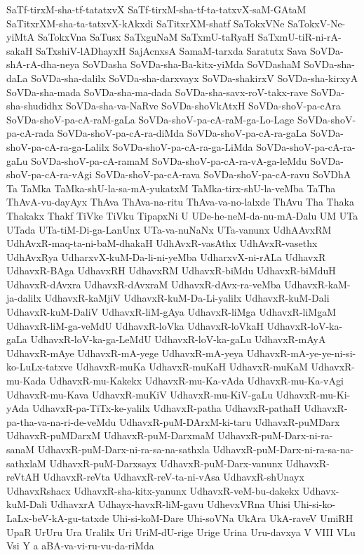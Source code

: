 {SaTf-tirxM-sha-tf-tatatxvX
SaTf-tirxM-sha-tf-ta-tatxvX-saM-GAtaM
SaTitxrXM-sha-ta-tatxvX-kAkxdi
SaTitxrXM-shatf
SaTokxVNe
SaTokxV-Ne-yiMtA
SaTokxVna
SaTusx
SaTxguNaM
SaTxmU-taRyaH
SaTxmU-tiR-ni-rA-sakaH
SaTxshiV-lADhayxH
SajAcnxsA
SamaM-tarxda
Saratutx
Sava
SoVDa-shA-rA-dha-neya
SoVDasha
SoVDa-sha-Ba-kitx-yiMda
SoVDashaM
SoVDa-sha-daLa
SoVDa-sha-dalilx
SoVDa-sha-darxvayx
SoVDa-shakirxV
SoVDa-sha-kirxyA
SoVDa-sha-mada
SoVDa-sha-ma-dada
SoVDa-sha-savx-roV-takx-rave
SoVDa-sha-shudidhx
SoVDa-sha-va-NaRve
SoVDa-shoVkAtxH
SoVDa-shoV-pa-cAra
SoVDa-shoV-pa-cA-raM-gaLa
SoVDa-shoV-pa-cA-raM-ga-Lo-Lage
SoVDa-shoV-pa-cA-rada
SoVDa-shoV-pa-cA-ra-diMda
SoVDa-shoV-pa-cA-ra-gaLa
SoVDa-shoV-pa-cA-ra-ga-Lalilx
SoVDa-shoV-pa-cA-ra-ga-LiMda
SoVDa-shoV-pa-cA-ra-gaLu
SoVDa-shoV-pa-cA-ramaM
SoVDa-shoV-pa-cA-ra-vA-ga-leMdu
SoVDa-shoV-pa-cA-ra-vAgi
SoVDa-shoV-pa-cA-rava
SoVDa-shoV-pa-cA-ravu
SoVDhA
Ta
TaMka
TaMka-shU-la-sa-mA-yukatxM
TaMka-tirx-shU-la-veMba
TaTha
ThAvA-vu-dayAyx
ThAva
ThAva-na-ritu
ThAva-va-no-lalxde
ThAvu
Tha
Thaka
Thakakx
Thakf
TiVke
TiVku
TipapxNi
U
UDe-he-neM-da-nu-mA-Dalu
UM
UTa
UTada
UTa-tiM-Di-ga-LanUnx
UTa-va-nuNaNx
UTa-vanunx
UdhAAvxRM
UdhAvxR-maq-ta-ni-baM-dhakaH
UdhAvxR-vasAthx
UdhAvxR-vasethx
UdhAvxRya
UdharxvX-kuM-Da-li-ni-yeMba
UdharxvX-ni-rALa
UdhavxR
UdhavxR-BAga
UdhavxRH
UdhavxRM
UdhavxR-biMdu
UdhavxR-biMduH
UdhavxR-dAvxra
UdhavxR-dAvxraM
UdhavxR-dAvx-ra-veMba
UdhavxR-kaM-ja-dalilx
UdhavxR-kaMjiV
UdhavxR-kuM-Da-Li-yalilx
UdhavxR-kuM-Dali
UdhavxR-kuM-DaliV
UdhavxR-liM-gAya
UdhavxR-liMga
UdhavxR-liMgaM
UdhavxR-liM-ga-veMdU
UdhavxR-loVka
UdhavxR-loVkaH
UdhavxR-loV-ka-gaLa
UdhavxR-loV-ka-ga-LeMdU
UdhavxR-loV-ka-gaLu
UdhavxR-mAyA
UdhavxR-mAye
UdhavxR-mA-yege
UdhavxR-mA-yeya
UdhavxR-mA-ye-ye-ni-si-ko-LuLx-tatxve
UdhavxR-muKa
UdhavxR-muKaH
UdhavxR-muKaM
UdhavxR-mu-Kada
UdhavxR-mu-Kakekx
UdhavxR-mu-Ka-vAda
UdhavxR-mu-Ka-vAgi
UdhavxR-mu-Kava
UdhavxR-muKiV
UdhavxR-mu-KiV-gaLu
UdhavxR-mu-Ki-yAda
UdhavxR-pa-TiTx-ke-yalilx
UdhavxR-patha
UdhavxR-pathaH
UdhavxR-pa-tha-va-na-ri-de-veMdu
UdhavxR-puM-DArxM-ki-taru
UdhavxR-puMDarx
UdhavxR-puMDarxM
UdhavxR-puM-DarxmaM
UdhavxR-puM-Darx-ni-ra-sanaM
UdhavxR-puM-Darx-ni-ra-sa-na-sathxla
UdhavxR-puM-Darx-ni-ra-sa-na-sathxlaM
UdhavxR-puM-Darxsayx
UdhavxR-puM-Darx-vanunx
UdhavxR-reVtAH
UdhavxR-reVta
UdhavxR-reV-ta-ni-vAsa
UdhavxR-shUnayx
UdhavxRshacx
UdhavxR-sha-kitx-yanunx
UdhavxR-veM-bu-dakekx
Udhavx-kuM-Dali
UdhavxrA
Udhayx-havxR-liM-gavu
UdhevxVRna
Uhisi
Uhi-si-ko-LaLx-beV-kA-gu-tatxde
Uhi-si-koM-Dare
Uhi-soVNa
UkAra
UkA-raveV
UmiRH
UpaR
UrUru
Ura
Uralilx
Uri
UriM-dU-rige
Urige
Urina
Uru-davxya
V
VIII
VLu
Vsi
Y
a
aBA-va-vi-ru-vu-da-riMda
}
